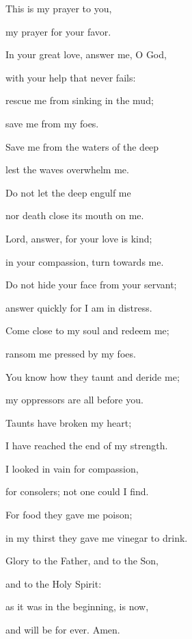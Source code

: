 \noindent This is my prayer to you,~\GreStar{}~\nopagebreak

my prayer for your favor.

\noindent In your great love, answer me, O God,~\GreStar{}~\nopagebreak

with your help that never fails:

\noindent rescue me from sinking in the mud;~\GreStar{}~\nopagebreak

save me from my foes.

\noindent Save me from the waters of the deep~\GreStar{}~\nopagebreak

lest the waves overwhelm me.

\noindent Do not let the deep engulf me~\GreStar{}~\nopagebreak

nor death close its mouth on me.

\noindent Lord, answer, for your love is kind;~\GreStar{}~\nopagebreak

in your compassion, turn towards me.

\noindent Do not hide your face from your servant;~\GreStar{}~\nopagebreak

answer quickly for I am in distress.

\noindent Come close to my soul and redeem me;~\GreStar{}~\nopagebreak

ransom me pressed by my foes.

\noindent You know how they taunt and deride me;~\GreStar{}~\nopagebreak

my oppressors are all before you.

\noindent Taunts have broken my heart;~\GreStar{}~\nopagebreak

I have reached the end of my strength.

\noindent I looked in vain for compassion,~\GreStar{}~\nopagebreak

for consolers; not one could I find.

\noindent For food they gave me poison;~\GreStar{}~\nopagebreak

in my thirst they gave me vinegar to drink.

\noindent Glory to the Father, and to the Son,~\GreStar{}~\nopagebreak

and to the Holy Spirit:

\noindent as it was in the beginning, is now,~\GreStar{}~\nopagebreak

and will be for ever. Amen.
